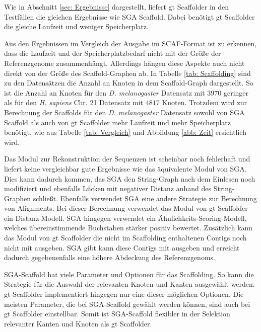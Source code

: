 \documentclass[a4paper,11pt,parskip]{scrartcl}
\begin{document}
Wie in Abschnitt \ref{sec: Ergebnisse} dargestellt, liefert gt
Scaffolder in den Testfällen die gleichen Ergebnisse wie SGA
Scaffold. Dabei benötigt gt Scaffolder die gleiche Laufzeit und
weniger Speicherplatz.

Aus den Ergebnissen im Vergleich der Ausgabe im SCAF-Format ist zu
erkennen, dass die Laufzeit und der Speicherplatzbedarf nicht mit der
Größe der Referenzgenome zusammenhängt. Allerdings hängen diese
Aspekte auch nicht direkt von der Größe des Scaffold-Graphen ab. In
Tabelle \ref{tab: Scaffolding} sind zu den Datensätzen die Anzahl an
Knoten in dem Scaffold-Graph dargestellt. So ist die Anzahl an Knoten
für den \textit{D. melanogaster} Datensatz mit $3970$ geringer als für
den \textit{H. sapiens} Chr. 21 Datensatz mit $4817$ Knoten. Trotzdem
wird zur Berechnung der Scaffolds für den \textit{D. melanogaster}
Datensatz sowohl von SGA Scaffold als auch von gt Scaffolder mehr
Laufzeit und mehr Speicherplatz benötigt, wie aus Tabelle \ref{tab:
  Vergleich} und Abbildung \ref{abb: Zeit} ersichtlich wird.

Das Modul zur Rekonstruktion der Sequenzen ist scheinbar noch
fehlerhaft und liefert keine vergleichbar gute Ergebnisse wie das
äquivalente Modul von SGA. Dies kann dadurch kommen, das SGA den
String-Graph nach dem Einlesen noch modifiziert und ebenfalls Lücken
mit negativer Distanz anhand des String-Graphen schließt. Ebenfalls
verwendet SGA eine andere Strategie zur Berechnung von Alignments. Bei
dieser Berechnung verwendet das Modul von gt Scaffolder ein
Distanz-Modell. SGA hingegen verwendet ein
Ähnlichkeits-Scoring-Modell, welches übereinstimmende Buchstaben
stärker positiv bewertet. Zusätzlich kann das Modul von gt Scaffolder
die nicht im Scaffolding enthaltenen Contigs noch nicht mit
ausgeben. SGA gibt kann diese Contigs mit ausgeben und erreicht
dadurch gegebenenfalls eine höhere Abdeckung des Referenzgenoms.

SGA-Scaffold hat viele Parameter und Optionen für das Scaffolding. So
kann die Strategie für die Auswahl der relevanten Knoten und Kanten
ausgewählt werden. gt Scaffolder implementiert hingegen nur eine
dieser möglichen Optionen. Die meisten Parameter, die bei SGA-Scaffold
gewählt werden können, sind auch bei gt Scaffolder einstellbar. Somit
ist SGA-Scaffold flexibler in der Selektion relevanter Kanten und
Knoten als gt Scaffolder.
\end{document}
